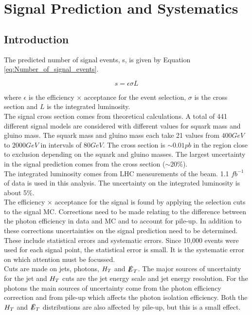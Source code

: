 \chapter{Signal Prediction and Systematics}

\section{Introduction}

The predicted number of signal events, s, is given by Equation
\ref{eq:Number_of_signal_events}.

\begin{equation}
s = \epsilon \sigma L
\label{eq:Number_of_signal_events}
\end{equation}

where $\epsilon$ is the efficiency $\times$ acceptance for the event selection,
$\sigma$ is the cross section and $L$ is the integrated luminosity. \\

The signal cross section comes from theoretical calculations. A total of 441 
different signal models are considered with different values for squark mass and 
gluino mass. The squark mass and gluino mass each take 21 values from $400 
\unit{GeV}$ to $2000 \unit{GeV}$ in intervals of $80 \unit{GeV}$. The cross 
section is $\sim 0.01 \unit{pb}$ in the region close to exclusion depending on 
the squark and gluino masses. The largest uncertainty in the signal prediction 
comes from the cross section ($\sim 20 \unit{\%}$). \\

The integrated luminosity comes from LHC measurements of the beam. 1.1
$\unit{fb^{-1}}$ of data is used in this analysis. The uncertainty on the 
integrated luminosity is about 5\unit{\%}. \\

The efficiency $\times$ acceptance for the signal is found by applying the 
selection cuts to the signal MC. Corrections need to be made relating to the 
difference between the photon efficiency in data and MC and to account for 
pile-up. In addition to these corrections uncertainties on the signal prediction
need to be determined. These include statistical errors and systematic errors. 
Since 10,000 events were used for each signal point, the statistical error is 
small. It is the systematic error on which attention must be focussed. 
\\

Cuts are made on jets, photons, $H_{T}$ and $\slashed{E}_{T}$. The major sources of
uncertainty for the jet and $H_{T}$ cuts are the jet energy scale and jet energy 
resolution. For the photons the main sources of uncertainty come from the photon
efficiency correction and from pile-up which affects the photon isolation 
efficiency. Both the $H_{T}$ and $\slashed{E}_{T}$ distributions are also affected by 
pile-up, but this is a small effect. \\

